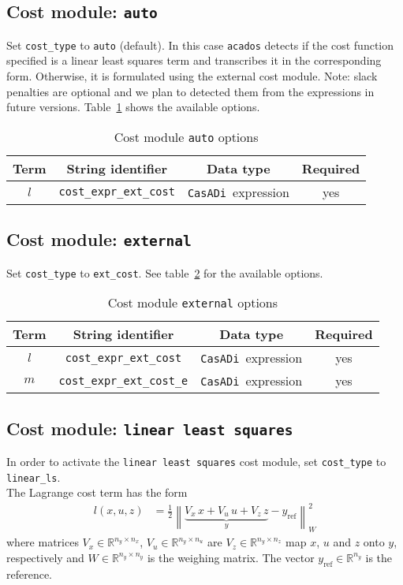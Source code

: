 \documentclass[
a4paper, %
10pt, %
notitlepage,
english]{CSUniSchoolLabReport}
\newcommand{\code}[1]{\texttt{#1}}
\newcommand{\casadi}{\texttt{CasADi}}
\newcommand{\acados}{\texttt{acados}}
\newcommand{\norm}[1]{\left\lVert#1\right\rVert}
\newcommand{\ind}[1]{_{\textrm{#1}}}
\newcommand{\mandatory}{yes}
\begin{document}
\begin{appendices}
\subsection{Cost module: \code{auto}}\label{sec:cost:auto}
%
Set \code{cost\_type} to \code{auto} (default).
In this case \acados{} detects if the cost function specified is a linear least squares term and transcribes it in the corresponding form.
Otherwise, it is formulated using the external cost module.
Note: slack penalties are optional and we plan to detected them from the expressions in future versions.
Table~\ref{tab:cost:auto} shows the available options.
%
\begin{table}[h!]
	\centering
	\caption{Cost module \code{auto} options} \label{tab:cost:auto}
	\begin{tabular}{cccc}
		\toprule
		Term & String identifier & Data type & Required \\ \midrule
		$ l $ & \code{cost\_expr\_ext\_cost}    & \casadi~expression   & \mandatory  \\ 
		\bottomrule
	\end{tabular}
\end{table}
%
\subsection{Cost module: \code{external}}\label{sec:cost:external}
%
Set \code{cost\_type} to \code{ext\_cost}.
See table~\ref{tab:cost:external} for the available options.
\begin{table}[h!]
	\centering
	\caption{Cost module \code{external} options} \label{tab:cost:external}
	\begin{tabular}{cccc}
		\toprule
		Term & String identifier & Data type & Required \\ \midrule
		$ l $ & \code{cost\_expr\_ext\_cost}    & \casadi~expression   & \mandatory  \\
		$ m $ & \code{cost\_expr\_ext\_cost\_e}    & \casadi~expression  & \mandatory \\
		\bottomrule
	\end{tabular}
\end{table}
%
\subsection{Cost module: \code{linear least squares}}\label{sec:cost:linear_ls}
%
In order to activate the \code{linear least squares} cost module, set \code{cost\_type} to \code{linear\_ls}.\\
The Lagrange cost term has the form
\begin{align}
	l(x, u, z) &= \frac{1}{2} \norm{ \underbrace{V_x\, x + V_u\, u + V_z\, z}_{\displaystyle y} - y\ind{ref}}_W^2 \label{eq:cost:linear_ls:l}
\end{align}
where matrices $ V_x \in \mathbb{R}^{n_y \times n_x}$, $V_u \in \mathbb{R}^{n_y \times n_u}$ are $V_z \in \mathbb{R}^{n_y \times n_z}$ map $x$, $u$ and $z$ onto $y$, respectively and $W \in \mathbb{R}^{n_y \times n_y}$ is the weighing matrix. The vector $y\ind{ref} \in \mathbb{R}^{n_y}$ is the reference.


\end{appendices}
\end{document}
